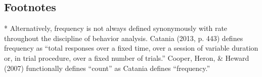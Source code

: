 \subsection{Footnotes}
* Alternatively, frequency is not always defined synonymously with rate throughout the discipline of behavior analysis. Catania (2013, p. 443) defines frequency as ``total responses over a fixed time, over a session of variable duration or, in trial procedure, over a fixed number of trials.'' Cooper, Heron, \& Heward (2007) functionally defines ``count'' as Catania defines ``frequency.''
